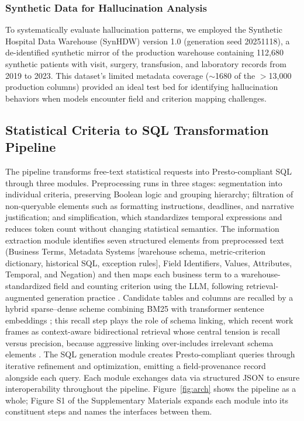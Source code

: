 \documentclass[applsci,article,submit,pdftex,oneauthor]{Definitions/mdpi}
\begin{document}
\subsubsection{Synthetic Data for Hallucination Analysis}
To systematically evaluate hallucination patterns, we employed the Synthetic Hospital Data Warehouse (SynHDW) version 1.0 (generation seed 20251118), a de-identified synthetic mirror of the production warehouse containing 112,680
synthetic patients with visit, surgery, transfusion, and laboratory records from
2019 to 2023. This dataset's limited metadata coverage ($\sim$1680 of the
$>$13,000 production columns) provided an ideal test bed for identifying
hallucination behaviors when models encounter field and criterion mapping
challenges.

\subsection{Statistical Criteria to SQL Transformation Pipeline}
The pipeline transforms free-text statistical requests into Presto-compliant SQL through three modules. Preprocessing runs in three stages: segmentation into individual criteria, preserving Boolean logic and grouping hierarchy; filtration of non-queryable elements such as formatting instructions, deadlines, and narrative justification; and simplification, which standardizes temporal expressions and reduces token count without changing statistical semantics. The information
extraction module identifies seven structured elements from preprocessed text
(Business Terms, Metadata Systems [warehouse schema, metric-criterion
dictionary, historical SQL, exception rules], Field Identifiers, Values,
Attributes, Temporal, and Negation) and then maps each business term to a
warehouse-standardized field and counting criterion using the LLM, following
retrieval-augmented generation practice \cite{lewis2020,finardi2024}. Candidate
tables and columns are recalled by a hybrid sparse--dense scheme combining BM25
\cite{bm252009} with transformer sentence embeddings
\cite{sbert2019,bert2019}; this recall step plays the
role of schema linking, which recent work frames as context-aware bidirectional
retrieval whose central tension is recall versus precision, because aggressive
linking over-includes irrelevant schema elements
\cite{schemalink2025,rslsql2024}. The SQL
generation module creates Presto-compliant queries through iterative refinement
and optimization, emitting a field-provenance record alongside each query. Each
module exchanges data via structured JSON to ensure interoperability throughout
the pipeline. Figure~\ref{fig:arch} shows the pipeline as a whole; Figure S1 of
the Supplementary Materials expands each module into its constituent steps and
names the interfaces between them.
\end{document}
